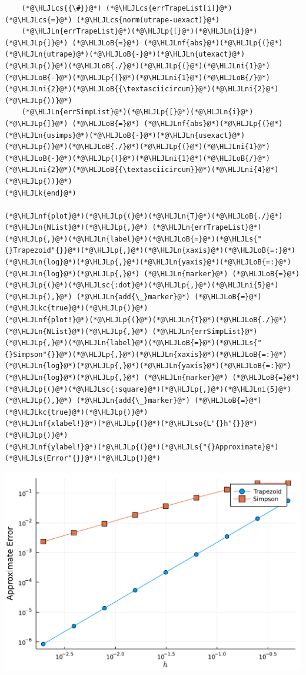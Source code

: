 \documentclass[12pt,a4paper]{article}
\newcommand{\HLJLk}[1]{\textcolor[RGB]{148,91,176}{\textbf{#1}}}
\newcommand{\HLJLkc}[1]{\textcolor[RGB]{59,151,46}{\textit{#1}}}
\newcommand{\HLJLn}[1]{#1}
\newcommand{\HLJLnf}[1]{\textcolor[RGB]{66,102,213}{#1}}
\newcommand{\HLJLs}[1]{\textcolor[RGB]{201,61,57}{#1}}
\newcommand{\HLJLsc}[1]{\textcolor[RGB]{201,61,57}{#1}}
\newcommand{\HLJLso}[1]{\textcolor[RGB]{201,61,57}{#1}}
\newcommand{\HLJLni}[1]{\textcolor[RGB]{59,151,46}{#1}}
\newcommand{\HLJLoB}[1]{\textcolor[RGB]{102,102,102}{\textbf{#1}}}
\newcommand{\HLJLp}[1]{#1}
\newcommand{\HLJLcs}[1]{\textcolor[RGB]{153,153,119}{\textit{#1}}}
\begin{document}
\begin{lstlisting}
    (*@\HLJLcs{{\#}}@*) (*@\HLJLcs{errTrapeList[i]}@*) (*@\HLJLcs{=}@*) (*@\HLJLcs{norm(utrape-uexact)}@*)
    (*@\HLJLn{errTrapeList}@*)(*@\HLJLp{[}@*)(*@\HLJLn{i}@*)(*@\HLJLp{]}@*) (*@\HLJLoB{=}@*) (*@\HLJLnf{abs}@*)(*@\HLJLp{(}@*)(*@\HLJLn{utrape}@*)(*@\HLJLoB{-}@*)(*@\HLJLn{utexact}@*)(*@\HLJLp{)}@*)(*@\HLJLoB{./}@*)(*@\HLJLp{(}@*)(*@\HLJLni{1}@*)(*@\HLJLoB{-}@*)(*@\HLJLp{(}@*)(*@\HLJLni{1}@*)(*@\HLJLoB{/}@*)(*@\HLJLni{2}@*)(*@\HLJLoB{{\textasciicircum}}@*)(*@\HLJLni{2}@*)(*@\HLJLp{))}@*)
    (*@\HLJLn{errSimpList}@*)(*@\HLJLp{[}@*)(*@\HLJLn{i}@*)(*@\HLJLp{]}@*) (*@\HLJLoB{=}@*) (*@\HLJLnf{abs}@*)(*@\HLJLp{(}@*)(*@\HLJLn{usimps}@*)(*@\HLJLoB{-}@*)(*@\HLJLn{usexact}@*)(*@\HLJLp{)}@*)(*@\HLJLoB{./}@*)(*@\HLJLp{(}@*)(*@\HLJLni{1}@*)(*@\HLJLoB{-}@*)(*@\HLJLp{(}@*)(*@\HLJLni{1}@*)(*@\HLJLoB{/}@*)(*@\HLJLni{2}@*)(*@\HLJLoB{{\textasciicircum}}@*)(*@\HLJLni{4}@*)(*@\HLJLp{))}@*)
(*@\HLJLk{end}@*)

(*@\HLJLnf{plot}@*)(*@\HLJLp{(}@*)(*@\HLJLn{T}@*)(*@\HLJLoB{./}@*)(*@\HLJLn{NList}@*)(*@\HLJLp{,}@*) (*@\HLJLn{errTrapeList}@*)(*@\HLJLp{,}@*)(*@\HLJLn{label}@*)(*@\HLJLoB{=}@*)(*@\HLJLs{"{}Trapezoid"{}}@*)(*@\HLJLp{,}@*)(*@\HLJLn{xaxis}@*)(*@\HLJLoB{=:}@*)(*@\HLJLn{log}@*)(*@\HLJLp{,}@*)(*@\HLJLn{yaxis}@*)(*@\HLJLoB{=:}@*)(*@\HLJLn{log}@*)(*@\HLJLp{,}@*) (*@\HLJLn{marker}@*) (*@\HLJLoB{=}@*) (*@\HLJLp{(}@*)(*@\HLJLsc{:dot}@*)(*@\HLJLp{,}@*)(*@\HLJLni{5}@*)(*@\HLJLp{),}@*) (*@\HLJLn{add{\_}marker}@*) (*@\HLJLoB{=}@*) (*@\HLJLkc{true}@*)(*@\HLJLp{)}@*)
(*@\HLJLnf{plot!}@*)(*@\HLJLp{(}@*)(*@\HLJLn{T}@*)(*@\HLJLoB{./}@*)(*@\HLJLn{NList}@*)(*@\HLJLp{,}@*) (*@\HLJLn{errSimpList}@*)(*@\HLJLp{,}@*)(*@\HLJLn{label}@*)(*@\HLJLoB{=}@*)(*@\HLJLs{"{}Simpson"{}}@*)(*@\HLJLp{,}@*)(*@\HLJLn{xaxis}@*)(*@\HLJLoB{=:}@*)(*@\HLJLn{log}@*)(*@\HLJLp{,}@*)(*@\HLJLn{yaxis}@*)(*@\HLJLoB{=:}@*)(*@\HLJLn{log}@*)(*@\HLJLp{,}@*) (*@\HLJLn{marker}@*) (*@\HLJLoB{=}@*) (*@\HLJLp{(}@*)(*@\HLJLsc{:square}@*)(*@\HLJLp{,}@*)(*@\HLJLni{5}@*)(*@\HLJLp{),}@*) (*@\HLJLn{add{\_}marker}@*) (*@\HLJLoB{=}@*) (*@\HLJLkc{true}@*)(*@\HLJLp{)}@*)
(*@\HLJLnf{xlabel!}@*)(*@\HLJLp{(}@*)(*@\HLJLso{L"{}h"{}}@*)(*@\HLJLp{)}@*)
(*@\HLJLnf{ylabel!}@*)(*@\HLJLp{(}@*)(*@\HLJLs{"{}Approximate}@*) (*@\HLJLs{Error"{}}@*)(*@\HLJLp{)}@*)
\end{lstlisting}

\includegraphics[width=\linewidth]{figures/ass_1_report_1_1.pdf}
\end{document}
